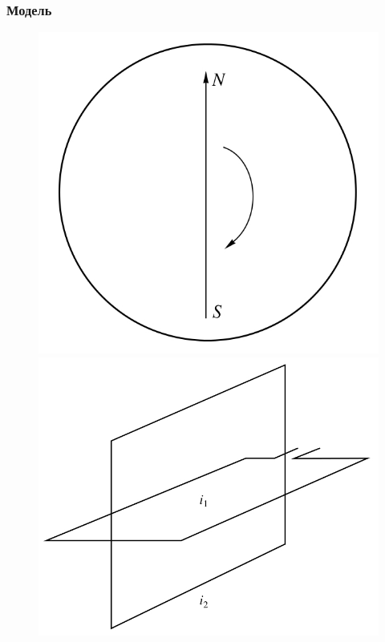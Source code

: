 \documentclass[14pt]{beamer}
\begin{document}
\begin{frame}
\frametitle{Модель}

\begin{figure}[H] 
  \begin{center}

  \begin{minipage}[h]{0.4\linewidth}

  \includegraphics[width=1\linewidth]{magnitnoe_pole}

  
  \end{minipage}
  \hfill   
  \begin{minipage}[h]{0.4\linewidth}
    
  \includegraphics[width=1\linewidth]{obmotki}
  

\end{minipage}
\end{center}
\end{figure}
\end{frame}
\end{document}
